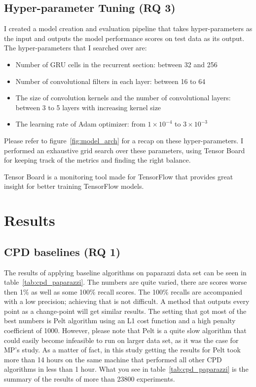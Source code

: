 \subsection{Hyper-parameter Tuning (RQ 3)}
I created a model creation and evaluation pipeline that takes hyper-parameters as the input and outputs the model performance scores on test data as its output. The hyper-parameters that I searched over are:
\begin{itemize}
    \item Number of GRU cells in the recurrent section: between 32 and 256
    \item Number of convolutional filters in each layer: between 16 to 64
    \item The size of convolution kernels and the number of convolutional layers: between 3 to 5 layers with increasing kernel size
    \item The learning rate of Adam optimizer: from $1\times 10^{-4}$ to $3\times10^{-3}$
\end{itemize}
Please refer to figure~\ref{fig:model_arch} for a recap on these hyper-parameters. 
I performed an exhaustive grid search over these parameters, using Tensor Board for keeping track of the metrics and finding the right balance.

Tensor Board is a monitoring tool made for TensorFlow \cite{tensorflow2015-whitepaper} that provides great insight for better training TensorFlow models.

\section{Results}
\subsection{CPD baselines (RQ 1)}

The results of applying baseline algorithms on paparazzi data set can be seen in table~\ref{tab:cpd_paparazzi}.
The numbers are quite varied, there are scores worse then 1\% as well as some 100\% recall scores. The 100\% recalls are accompanied with a low precision; achieving that is not difficult. A method that outputs every point as a change-point will get similar results. The setting that got most of the best numbers is Pelt algorithm using an L1 cost function and a high penalty coefficient of 1000. However, please note that Pelt is a quite slow algorithm that could easily become infeasible to run on larger data set, as it was the case for MP's study. As a matter of fact, in this study getting the results for Pelt took more than 14 hours on the same machine that performed all other CPD algorithms in less than 1 hour. What you see in table~\ref{tab:cpd_paparazzi} is the summary of the results of more than 23800 experiments. 

